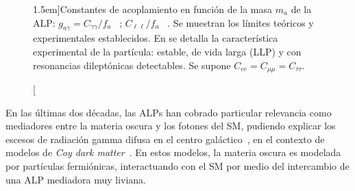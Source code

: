 \begin{figure}[t]
  \centering
  \hfill

  \caption[][1.5em]{Constantes de acoplamiento en función de la masa $m_a$ de la ALP: $g_{a\gamma} = C_{\gamma\gamma}/f_a$ ~; $C_{\ell\ell}/f_a$ ~. Se muestran los límites teóricos y experimentales establecidos. En  se detalla la característica experimental de la partícula: estable, de vida larga (LLP) y con resonancias dileptónicas detectables. Se supone $C_{ee} = C_{\mu\mu} = C_{\tau\tau}$.}
  \label{fig:ch1:ALP:g-vs-m_a}
\end{figure}

En las últimas dos décadas, las ALPs han cobrado particular relevancia como mediadores entre la materia oscura y los fotones del SM, pudiendo explicar los escesos de radiación gamma difusa en el centro galáctico~\cite{Hooper2011,Abazajian2012,Daylan2016}, en el contexto de modelos de \textit{Coy dark matter}~\cite{Bhm2014,Hektor2014}. En estos modelos, la materia oscura es modelada por partículas fermiónicas, interactuando con el SM por medio del intercambio de una ALP mediadora muy liviana.

